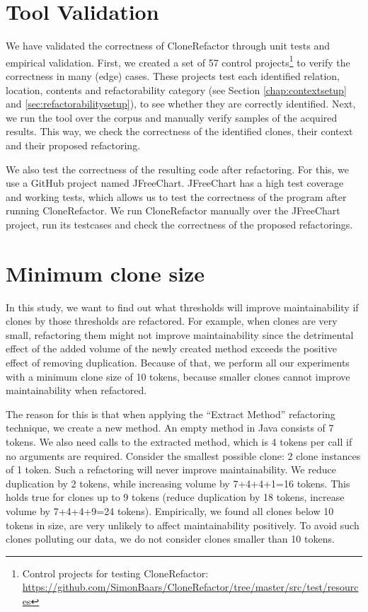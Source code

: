 \section{Tool Validation}
We have validated the correctness of CloneRefactor through unit tests and empirical validation. First, we created a set of 57 control projects\footnote{Control projects for testing CloneRefactor: \url{https://github.com/SimonBaars/CloneRefactor/tree/master/src/test/resources}} to verify the correctness in many (edge) cases. These projects test each identified relation, location, contents and refactorability category (see Section \ref{chap:contextsetup} and \ref{sec:refactorabilitysetup}), to see whether they are correctly identified. Next, we run the tool over the corpus and manually verify samples of the acquired results. This way, we check the correctness of the identified clones, their context and their proposed refactoring.

We also test the correctness of the resulting code after refactoring. For this, we use a GitHub project named JFreeChart. JFreeChart has a high test coverage and working tests, which allows us to test the correctness of the program after running CloneRefactor. We run CloneRefactor manually over the JFreeChart project, run its testcases and check the correctness of the proposed refactorings.

\section{Minimum clone size}
In this study, we want to find out what thresholds will improve maintainability if clones by those thresholds are refactored. For example, when clones are very small, refactoring them might not improve maintainability since the detrimental effect of the added volume of the newly created method exceeds the positive effect of removing duplication. Because of that, we perform all our experiments with a minimum clone size of 10 tokens, because smaller clones cannot improve maintainability when refactored.

The reason for this is that when applying the ``Extract Method'' refactoring technique, we create a new method. An empty method in Java consists of 7 tokens. We also need calls to the extracted method, which is 4 tokens per call if no arguments are required. Consider the smallest possible clone: 2 clone instances of 1 token. Such a refactoring will never improve maintainability. We reduce duplication by 2 tokens, while increasing volume by 7+4+4+1=16 tokens. This holds true for clones up to 9 tokens (reduce duplication by 18 tokens, increase volume by 7+4+4+9=24 tokens). Empirically, we found all clones below 10 tokens in size, are very unlikely to affect maintainability positively. To avoid such clones polluting our data, we do not consider clones smaller than 10 tokens.


